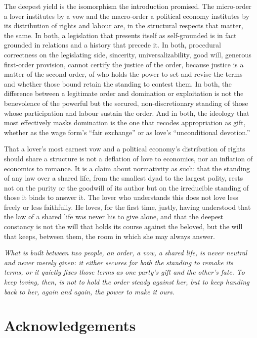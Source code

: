 \documentclass[11pt,a4paper]{article}
\begin{document}
The deepest yield is the isomorphism the introduction promised. The micro-order a lover institutes by a vow and the macro-order a political economy institutes by its distribution of rights and labour are, in the structural respects that matter, the same. In both, a legislation that presents itself as self-grounded is in fact grounded in relations and a history that precede it. In both, procedural correctness on the legislating side, sincerity, universalizability, good will, generous first-order provision, cannot certify the justice of the order, because justice is a matter of the second order, of who holds the power to set and revise the terms and whether those bound retain the standing to contest them. In both, the difference between a legitimate order and domination or exploitation is not the benevolence of the powerful but the secured, non-discretionary standing of those whose participation and labour sustain the order. And in both, the ideology that most effectively masks domination is the one that recodes appropriation as gift, whether as the wage form's ``fair exchange'' or as love's ``unconditional devotion.''

That a lover's most earnest vow and a political economy's distribution of rights should share a structure is not a deflation of love to economics, nor an inflation of economics to romance. It is a claim about normativity as such: that the standing of any law over a shared life, from the smallest dyad to the largest polity, rests not on the purity or the goodwill of its author but on the irreducible standing of those it binds to answer it. The lover who understands this does not love less freely or less faithfully. He loves, for the first time, justly, having understood that the law of a shared life was never his to give alone, and that the deepest constancy is not the will that holds its course against the beloved, but the will that keeps, between them, the room in which she may always answer.

\medskip
{\color{warnred}\itshape What is built between two people, an order, a vow, a shared life, is never neutral and never merely given: it either secures for both the standing to remake its terms, or it quietly fixes those terms as one party's gift and the other's fate. To keep loving, then, is not to hold the order steady against her, but to keep handing back to her, again and again, the power to make it ours.}

\section*{Acknowledgements}
\end{document}
